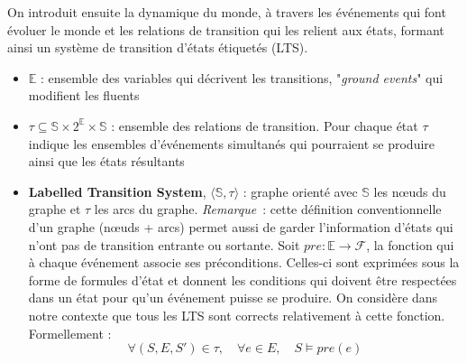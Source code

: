 On introduit ensuite la dynamique du monde, à travers les événements qui font évoluer le monde et les relations de transition qui les relient aux états, formant ainsi un système de transition d'états étiquetés (LTS).
\begin{itemize}
    \item $\mathds{E}$ : ensemble des variables qui décrivent les transitions, "\textit{ground events}" qui modifient les fluents
    \item $\tau \subseteq \mathds{S} \times 2^{\mathds{E}} \times \mathds{S}$ : ensemble des relations de transition. Pour chaque état $\tau$ indique les  ensembles d'événements simultanés qui pourraient se produire ainsi que les états résultants
    \item \textbf{Labelled Transition System}, $\langle\mathds{S}, \tau\rangle$ : graphe orienté avec $\mathds{S}$ les nœuds du graphe et $\tau$ les arcs du graphe. \textit{Remarque}~: cette définition conventionnelle d'un graphe (nœuds + arcs) permet aussi de garder l'information d'états qui n'ont pas de transition entrante ou sortante. Soit $pre: \mathds{E}\to \mathcal{F}$, la fonction qui à chaque événement associe ses préconditions. Celles-ci sont exprimées sous la forme de formules d'état et donnent les conditions qui doivent être respectées dans un état pour qu'un événement puisse se produire. On considère dans notre contexte que tous les LTS sont corrects relativement à cette fonction. Formellement :
        \begin{equation*}
            \forall (S,E,S') \in \tau,  \quad \forall e \in E, \quad S\models pre(e)
        \end{equation*}
    \end{itemize}


